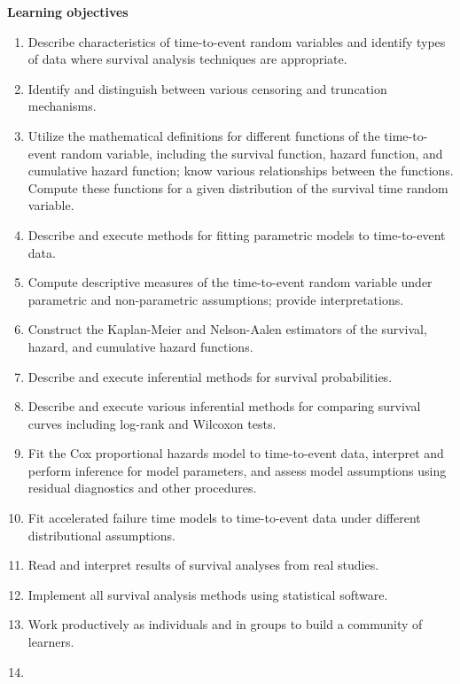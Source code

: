 \documentclass[letterpaper,12pt]{report}
\begin{document}
\textbf{Learning objectives}
\begin{enumerate}
\item  Describe characteristics of time-to-event random variables and identify types of data where survival analysis techniques are appropriate.

\item Identify and distinguish between various censoring and truncation mechanisms.

\item Utilize the mathematical definitions for different functions of the time-to-event random variable, including the survival function, hazard function, and cumulative hazard function; know various relationships between the functions.  Compute these functions for a given distribution of the survival time random variable.

\item Describe and execute methods for fitting parametric models to time-to-event data.

\item Compute descriptive measures of the time-to-event random variable under parametric and non-parametric assumptions; provide interpretations.

\item Construct the Kaplan-Meier and Nelson-Aalen estimators of the survival, hazard, and cumulative hazard functions.

\item Describe and execute inferential methods for survival probabilities.

\item Describe and execute various inferential methods for comparing survival curves including
log-rank and Wilcoxon tests.

\item Fit the Cox proportional hazards model to time-to-event data, interpret and perform inference for model parameters, and assess model assumptions using residual diagnostics and other procedures.

\item Fit accelerated failure time models to time-to-event data under different distributional
assumptions.

\item Read and interpret results of survival analyses from real studies.

\item Implement all survival analysis methods using statistical software.

\item Work productively as individuals and in groups to build a community of learners.
\item[]
\end{enumerate}
\end{document}
